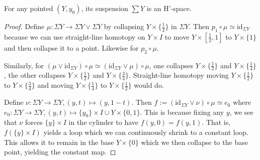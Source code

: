 \documentclass[12pt]{article}
\begin{document}
\begin{problem}[3]
\begin{lem}
For any pointed $ (Y,y_0)$, its suspension $ \sum Y$ is an  H'-space.
\end{lem}
\end{problem}
\begin{proof}
	Define $ \mu: \Sigma Y \to \Sigma Y \vee \Sigma Y$ by collapsing $ Y \times \{\frac{1}{2}\} $ in $ \Sigma Y$. Then $ p_1 \circ \mu \simeq \text{id}_{ \Sigma Y}$ because we can use straight-line homotopy on $ Y \times I$ to move $ Y \times [\frac{1}{2},1]$ to $ Y \times \{1\} $ and then collapse it to a point. Likewise for $ p_2 \circ \mu$.

	Similarly, for $ (\mu \vee \text{id}_{ \Sigma Y}) \circ \mu \simeq ( \text{id}_{ \Sigma Y} \vee \mu) \circ \mu$, one collapses $ Y \times  \{\frac{1}{2}\} $ and $ Y \times \{\frac{1}{4}\} $, the other collapses $ Y \times \{\frac{1}{2}\} $ and $ Y \times \{\frac{3}{4}\} $. Straight-line homotopy moving $Y \times  \{\frac{1}{2}\}$ to $Y \times  \{\frac{3}{4}\}$ and moving $Y \times  \{\frac{1}{4}\}$ to $Y \times  \{\frac{1}{2}\}$ would do.

Define $ \nu: \Sigma Y \to \Sigma Y, (y,t)\mapsto (y,1-t)$. Then $f:= (\text{id}_{ \Sigma Y} \vee \nu) \circ \mu \simeq e_0$ where $ e_0: \Sigma  Y \to \Sigma  Y, (y,t) \mapsto \{y_0\} \times I \cup Y \times \{0,1\} $. This is because fixing any $ y$, we see that  $ \nu$ forces $ \{y\}  \times I$ in the cylinder to have $ f(y,0) = f(y,1)$. That is, $ f( \{y\} \times I )$ yields a loop which we can continuously shrink to a constant loop. This allows it to remain in the base $ Y \times \{0\} $ which we then collapse to the base point, yielding the constant map.

\end{proof}
\end{document}
